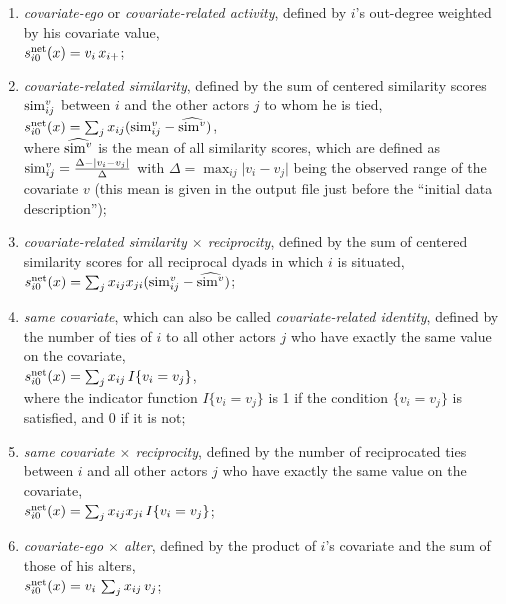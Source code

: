 \documentclass[a4paper,fleqn]{article}
\newcommand{\+}{\, + \,}
\newcommand{\vit}{\theenumi}
\begin{document}
{\begin{enumerate}
 \item {\em covariate-ego} or {\em covariate-related activity},
 defined by $i$'s out-degree weighted by his covariate value,\\
 $s^{\rm net}_{i\vit}(x) = v_i \, x_{i+} $;

 \item {\em covariate-related similarity}, defined by the
 sum of centered similarity scores ${\rm sim}^v_{ij}$ between $i$
 and the other actors $j$ to whom he is tied,\\
 $s^{\rm net}_{i\vit}(x) = \sum_j x_{ij} ({\rm sim}^v_{ij} - \widehat{{\rm sim}^v}) $,\\
 where $\widehat{{\rm sim}^v}$ is the mean of all similarity scores, which are defined as
 ${\rm sim}^v_{ij}=\frac{\Delta-\vert v_i - v_j \vert}{\Delta}$ with
 $\Delta=\max_{ij}\vert v_i - v_j \vert$ being the observed range of the covariate $v$
 (this mean is given in the output file just before the
 ``initial data description'');

 \item {\em covariate-related similarity $\times$ reciprocity}, defined by
 the sum of centered similarity scores for all
 reciprocal dyads in which $i$ is situated,\\
 $s^{\rm net}_{i\vit}(x) = \sum_j x_{ij}x_{ji} ({\rm sim}^v_{ij} - \widehat{{\rm sim}^v}) $;

 \item \emph{same covariate}, which can also be called {\em covariate-related identity},
 defined by the
 number of ties of $i$ to all other actors $j$ who have
 exactly the same value on the covariate,\\
 $s^{\rm net}_{i\vit}(x) = \sum_j x_{ij}\, I\{v_i = v_j \} $,\\
 where the indicator function $I\{v_i = v_j \} $ is 1 if the condition $\{v_i = v_j \} $
 is satisfied, and 0 if it is not;

 \item {\em same covariate $\times$ reciprocity}, defined by the
 number of reciprocated ties between $i$ and all other actors $j$ who have
 exactly the same value on the covariate,\\
 $s^{\rm net}_{i\vit}(x) = \sum_j x_{ij} x_{ji}\, I\{v_i = v_j \} $;

 \item {\em covariate-ego $\times$ alter},
 defined by the product of $i$'s covariate and the sum of those of his alters,\\
 $s^{\rm net}_{i\vit}(x) = v_i \, \sum_j x_{ij}\, v_j $;


\end{enumerate}}
\end{document}
